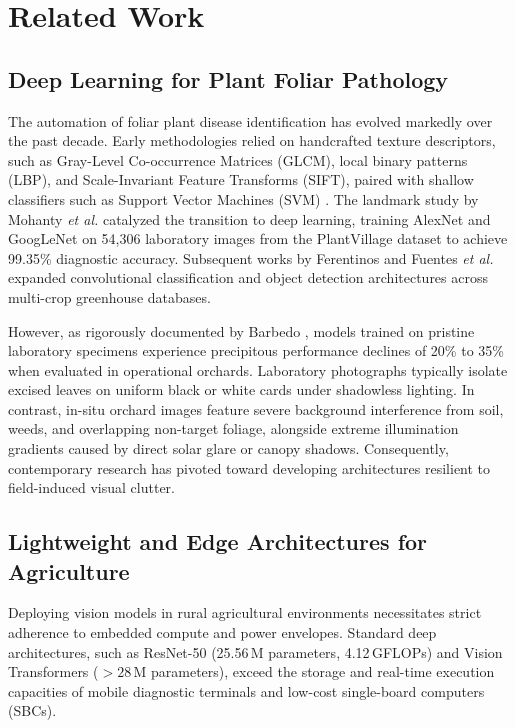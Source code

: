 \section{Related Work}
\label{sec:related}

\subsection{Deep Learning for Plant Foliar Pathology}
The automation of foliar plant disease identification has evolved markedly over the past decade. Early methodologies relied on handcrafted texture descriptors, such as Gray-Level Co-occurrence Matrices (GLCM), local binary patterns (LBP), and Scale-Invariant Feature Transforms (SIFT), paired with shallow classifiers such as Support Vector Machines (SVM) \cite{kamencay2020improved}. The landmark study by Mohanty \textit{et al.} \cite{mohanty2016using} catalyzed the transition to deep learning, training AlexNet and GoogLeNet on 54,306 laboratory images from the PlantVillage dataset to achieve 99.35\% diagnostic accuracy. Subsequent works by Ferentinos \cite{ferentinos2018deep} and Fuentes \textit{et al.} \cite{fuentes2017robust} expanded convolutional classification and object detection architectures across multi-crop greenhouse databases.

However, as rigorously documented by Barbedo \cite{barbedo2019plant}, models trained on pristine laboratory specimens experience precipitous performance declines of 20\% to 35\% when evaluated in operational orchards. Laboratory photographs typically isolate excised leaves on uniform black or white cards under shadowless lighting. In contrast, in-situ orchard images feature severe background interference from soil, weeds, and overlapping non-target foliage, alongside extreme illumination gradients caused by direct solar glare or canopy shadows. Consequently, contemporary research has pivoted toward developing architectures resilient to field-induced visual clutter.

\subsection{Lightweight and Edge Architectures for Agriculture}
Deploying vision models in rural agricultural environments necessitates strict adherence to embedded compute and power envelopes. Standard deep architectures, such as ResNet-50 \cite{he2016deep} (25.56\,M parameters, 4.12\,GFLOPs) and Vision Transformers \cite{dosovitskiy2020image, liu2021swin} ($>28\,\text{M}$ parameters), exceed the storage and real-time execution capacities of mobile diagnostic terminals and low-cost single-board computers (SBCs).

